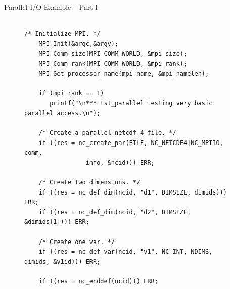 \documentclass[compress,11pt,xcolor=svgnames,aspectratio=169]{beamer}
\begin{document}
\begin{frame}[fragile] {Parallel I/O Example -- Part I}

\begin{figure}
\centering
\begin{varwidth}{\linewidth}
{ \tiny

\begin{verbatim}

/* Initialize MPI. */
    MPI_Init(&argc,&argv);
    MPI_Comm_size(MPI_COMM_WORLD, &mpi_size);
    MPI_Comm_rank(MPI_COMM_WORLD, &mpi_rank);
    MPI_Get_processor_name(mpi_name, &mpi_namelen);

    if (mpi_rank == 1)
       printf("\n*** tst_parallel testing very basic parallel access.\n");

    /* Create a parallel netcdf-4 file. */
    if ((res = nc_create_par(FILE, NC_NETCDF4|NC_MPIIO, comm,
			     info, &ncid))) ERR;

    /* Create two dimensions. */
    if ((res = nc_def_dim(ncid, "d1", DIMSIZE, dimids))) ERR;
    if ((res = nc_def_dim(ncid, "d2", DIMSIZE, &dimids[1]))) ERR;

    /* Create one var. */
    if ((res = nc_def_var(ncid, "v1", NC_INT, NDIMS, dimids, &v1id))) ERR;

    if ((res = nc_enddef(ncid))) ERR;

\end{verbatim}

}
\end{varwidth}
\end{figure}

\end{frame}
\end{document}
